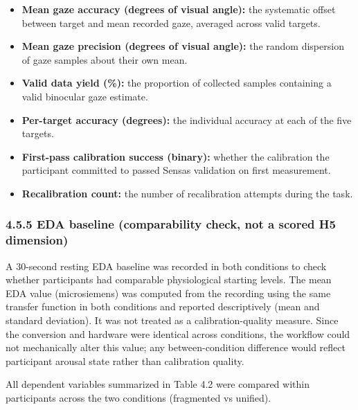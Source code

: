 \documentclass[
]{article}
\begin{document}
\begin{itemize}
\item
  \textbf{Mean gaze accuracy (degrees of visual angle):} the systematic offset between target and mean recorded gaze, averaged across valid targets.
\item
  \textbf{Mean gaze precision (degrees of visual angle):} the random dispersion of gaze samples about their own mean.
\item
  \textbf{Valid data yield (\%):} the proportion of collected samples containing a valid binocular gaze estimate.
\item
  \textbf{Per-target accuracy (degrees):} the individual accuracy at each of the five targets.
\item
  \textbf{First-pass calibration success (binary):} whether the calibration the participant committed to passed Sensa\textquotesingle s validation on first measurement.
\item
  \textbf{Recalibration count:} the number of recalibration attempts during the task.
\end{itemize}

\hypertarget{eda-baseline-comparability-check-not-a-scored-h5-dimension}{%
\subsubsection{4.5.5 EDA baseline (comparability check, not a scored H5 dimension)}\label{eda-baseline-comparability-check-not-a-scored-h5-dimension}}

A 30-second resting EDA baseline was recorded in both conditions to check whether participants had comparable physiological starting levels. The mean EDA value (microsiemens) was computed from the recording using the same transfer function in both conditions and reported descriptively (mean and standard deviation). It was not treated as a calibration-quality measure. Since the conversion and hardware were identical across conditions, the workflow could not mechanically alter this value; any between-condition difference would reflect participant arousal state rather than calibration quality.

All dependent variables summarized in Table 4.2 were compared within participants across the two conditions (fragmented vs unified).
\end{document}
